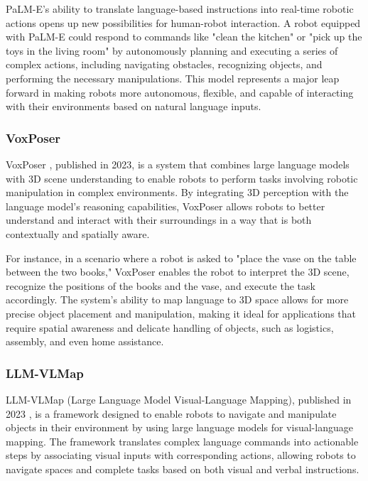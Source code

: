 PaLM-E's ability to translate language-based instructions into real-time robotic actions opens up new possibilities for human-robot interaction. 
A robot equipped with PaLM-E could respond to commands like "clean the kitchen" or "pick up the toys in the living room" by autonomously planning and executing a series of complex actions, including navigating obstacles, recognizing objects, and performing the necessary manipulations. 
This model represents a major leap forward in making robots more autonomous, flexible, and capable of interacting with their environments based on natural language inputs.

\subsubsection{VoxPoser}

VoxPoser \cite{huang2023voxposer}, published in 2023, is a system that combines large language models with 3D scene understanding to enable robots to perform tasks involving robotic manipulation in complex environments. 
By integrating 3D perception with the language model's reasoning capabilities, VoxPoser allows robots to better understand and interact with their surroundings in a way that is both contextually and spatially aware.

For instance, in a scenario where a robot is asked to "place the vase on the table between the two books," VoxPoser enables the robot to interpret the 3D scene, recognize the positions of the books and the vase, and execute the task accordingly. 
The system's ability to map language to 3D space allows for more precise object placement and manipulation, making it ideal for applications that require spatial awareness and delicate handling of objects, such as logistics, assembly, and even home assistance.

\subsubsection{LLM-VLMap}

LLM-VLMap (Large Language Model Visual-Language Mapping), published in 2023 \cite{huang23vlmaps}, is a framework designed to enable robots to navigate and manipulate objects in their environment by using large language models for visual-language mapping. 
The framework translates complex language commands into actionable steps by associating visual inputs with corresponding actions, allowing robots to navigate spaces and complete tasks based on both visual and verbal instructions.


